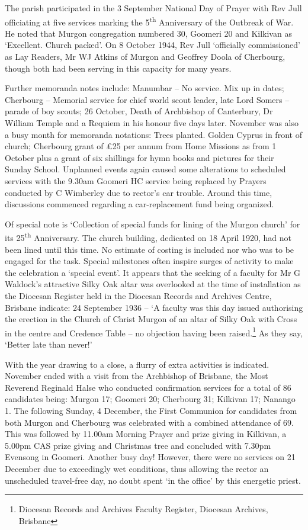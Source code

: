 The parish participated in the 3 September National Day of Prayer with
Rev Jull officiating at five services marking the 5\textsuperscript{th}
Anniversary of the Outbreak of War. He noted that Murgon congregation
numbered 30, Goomeri 20 and Kilkivan as `Excellent. Church packed'. On 8
October 1944, Rev Jull `officially commissioned' as Lay Readers, Mr WJ
Atkins of Murgon and Geoffrey Doola of Cherbourg, though both had been
serving in this capacity for many years.

Further memoranda notes include: Manumbar -- No service. Mix up in
dates; Cherbourg -- Memorial service for chief world scout leader, late
Lord Somers -- parade of boy scouts; 26 October, Death of Archbishop of
Canterbury, Dr William Temple and a Requiem in his honour five days
later. November was also a busy month for memoranda notations: Trees
planted. Golden Cyprus in front of church; Cherbourg grant of £25 per
annum from Home Missions as from 1 October plus a grant of six shillings
for hymn books and pictures for their Sunday School. Unplanned events
again caused some alterations to scheduled services with the 9.30am
Goomeri HC service being replaced by Prayers conducted by C Wimberley
due to rector's car trouble. Around this time, discussions commenced
regarding a car-replacement fund being organized.

Of special note is `Collection of special funds for lining of the Murgon
church' for its 25\textsuperscript{th} Anniversary. The church building,
dedicated on 18 April 1920, had not been lined until this time. No
estimate of costing is included nor who was to be engaged for the task.
Special milestones often inspire surges of activity to make the
celebration a `special event'. It appears that the seeking of a faculty
for Mr G Waldock's attractive Silky Oak altar was overlooked at the time
of installation as the Diocesan Register held in the Diocesan Records
and Archives Centre, Brisbane indicate: 24 September 1936 -- `A faculty
was this day issued authorising the erection in the Church of Christ
Murgon of an altar of Silky Oak with Cross in the centre and Credence
Table -- no objection having been raised.\footnote{Diocesan Records and
  Archives Faculty Register, Diocesan Archives, Brisbane} As they say,
`Better late than never!'

With the year drawing to a close, a flurry of extra activities is
indicated. November ended with a visit from the Archbishop of Brisbane,
the Most Reverend Reginald Halse who conducted confirmation services for
a total of 86 candidates being: Murgon 17; Goomeri 20; Cherbourg 31;
Kilkivan 17; Nanango 1. The following Sunday, 4 December, the First
Communion for candidates from both Murgon and Cherbourg was celebrated
with a combined attendance of 69. This was followed by 11.00am Morning
Prayer and prize giving in Kilkivan, a 5.00pm CAS prize giving and
Christmas tree and concluded with 7.30pm Evensong in Goomeri. Another
busy day! However, there were no services on 21 December due to
exceedingly wet conditions, thus allowing the rector an unscheduled
travel-free day, no doubt spent `in the office' by this energetic
priest.

